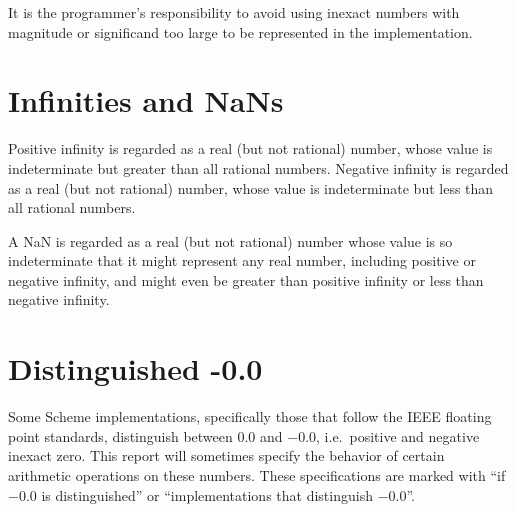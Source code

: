 It is the programmer's responsibility to avoid using inexact numbers
with magnitude or significand too large to be represented in the
implementation.

\section{Infinities and NaNs}

Positive infinity is regarded as a real (but not rational) number,
whose value is indeterminate but greater than all rational numbers.
Negative infinity is regarded as a real (but not rational) number,
whose value is indeterminate but less than all rational numbers.

A NaN is regarded as a real (but not rational) number whose value is
so indeterminate that it might represent any real number, including
positive or negative infinity, and might even be greater than positive
infinity or less than negative infinity.

\section{Distinguished -0.0}

Some Scheme implementations, specifically those that follow the IEEE
floating point standards, distinguish between $0.0$ and $-0.0$, i.e.\
positive and negative inexact zero.  This report will sometimes
specify the behavior of certain arithmetic operations on these
numbers.  These specifications are marked with ``if $-0.0$ is
distinguished'' or ``implementations that distinguish $-0.0$''.

